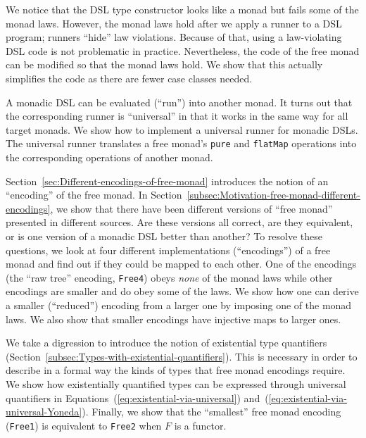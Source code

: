 We notice that the DSL type constructor looks like a monad but fails
some of the monad laws. However, the monad laws hold after we apply
a runner to a DSL program; runners \textsf{``}hide\textsf{''} law violations. Because
of that, using a law-violating DSL code is not problematic in practice.
Nevertheless, the code of the free monad can be modified so that the
monad laws hold. We show that this actually simplifies the code as
there are fewer case classes needed.

A monadic DSL can be evaluated (\textsf{``}run\textsf{''}) into another monad. It
turns out that the corresponding runner is \textsf{``}universal\textsf{''} in that
it works in the same way for all target monads. We show how to implement
a universal runner for monadic DSLs. The universal runner translates
a free monad\textsf{'}s \lstinline!pure! and \lstinline!flatMap! operations
into the corresponding operations of another monad.

Section~\ref{sec:Different-encodings-of-free-monad} introduces the
notion of an \textsf{``}encoding\textsf{''} of the free monad. In Section~\ref{subsec:Motivation-free-monad-different-encodings},
we show that there have been different versions of \textsf{``}free monad\textsf{''}
presented in different sources. Are these versions all correct, are
they equivalent, or is one version of a monadic DSL better than another?
To resolve these questions, we look at four different implementations
(\textsf{``}encodings\textsf{''}) of a free monad and find out if they could be mapped
to each other. One of the encodings (the \textsf{``}raw tree\textsf{''} encoding,
\lstinline!Free4!) obeys \emph{none} of the monad laws while other
encodings are smaller and do obey some of the laws. We show how one
can derive a smaller (\textsf{``}reduced\textsf{''}) encoding from a larger one by
imposing one of the monad laws. We also show that smaller encodings
have injective maps to larger ones.

We take a digression to introduce the notion of existential type quantifiers
(Section~\ref{subsec:Types-with-existential-quantifiers}). This
is necessary in order to describe in a formal way the kinds of types
that free monad encodings require. We show how existentially quantified
types can be expressed through universal quantifiers in Equations~(\ref{eq:existential-via-universal})
and~(\ref{eq:existential-via-universal-Yoneda}). Finally, we show
that the \textsf{``}smallest\textsf{''} free monad encoding (\lstinline!Free1!) is
equivalent to \lstinline!Free2! when $F$ is a functor.

